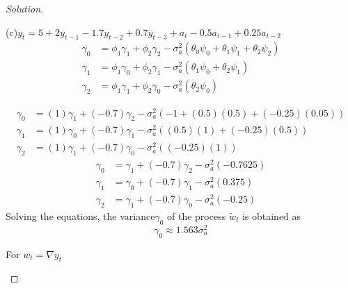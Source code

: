 \documentclass[UTF8,a4paper,14pt]{ctexart}
\newenvironment{solution}
  {\renewcommand\qedsymbol{$\blacksquare$}\begin{proof}[Solution]}
  {\end{proof}}
\theoremstyle{definition}
\theoremstyle{remark}
\begin{document}
\begin{solution}
\begin{mybox}{(c)\(y_t = 5+2y_{t-1}-1.7y_{t-2}+0.7y_{t-3}+a_t-0.5 a_{t-1}+0.25 a_{t-2}\)}
      \begin{equation*}
        \begin{aligned}
          \gamma_0 &= \phi_1\gamma_1+\phi_2\gamma_2-\sigma_a^2(\theta_0\psi_0+\theta_1\psi_1+\theta_2\psi_2)\\
          \gamma_1 &= \phi_1\gamma_0+\phi_2\gamma_1-\sigma_a^2(\theta_1\psi_0+\theta_2\psi_1)\\
          \gamma_2 &= \phi_1\gamma_1+\phi_2\gamma_0-\sigma_a^2(\theta_2\psi_0)
        \end{aligned}
      \end{equation*}


      \begin{equation*}
        \begin{aligned}
          \gamma_0 &= (1)\gamma_1+(-0.7)\gamma_2-\sigma_a^2(-1+(0.5)(0.5)+(-0.25)(0.05))\\
          \gamma_1 &= (1)\gamma_0+(-0.7)\gamma_1-\sigma_a^2((0.5)(1)+(-0.25)(0.5))\\
          \gamma_2 &= (1)\gamma_1+(-0.7)\gamma_0-\sigma_a^2((-0.25)(1))
        \end{aligned}
      \end{equation*}
      \begin{equation*}
        \begin{aligned}
          \gamma_0 &= \gamma_1+(-0.7)\gamma_2-\sigma_a^2(-0.7625)\\
          \gamma_1 &= \gamma_0+(-0.7)\gamma_1-\sigma_a^2(0.375)\\
          \gamma_2 &= \gamma_1+(-0.7)\gamma_0-\sigma_a^2(-0.25)
        \end{aligned}
      \end{equation*}
      Solving the equations, the variance\(\gamma_0\) of the process \({\tilde{w}_t}\) is obtained as
      \begin{equation*}
          \gamma_0 \approx 1.563\sigma_a^2
      \end{equation*}

      For \(w_t = \nabla y_t\)


\end{mybox}
\end{solution}
\end{document}
